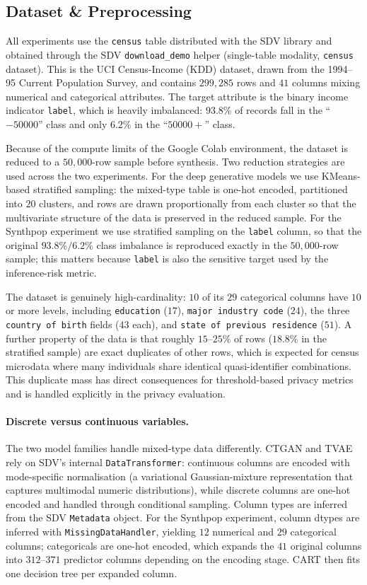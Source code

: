 \documentclass[11pt]{article}
\begin{document}
\subsection{Dataset \& Preprocessing}

All experiments use the \texttt{census} table distributed with the SDV library and obtained through the SDV \texttt{download\_demo} helper (single-table modality, \texttt{census} dataset). This is the UCI Census-Income (KDD) dataset, drawn from the 1994--95 Current Population Survey, and contains $299{,}285$ rows and $41$ columns mixing numerical and categorical attributes. The target attribute is the binary income indicator \texttt{label}, which is heavily imbalanced: $93.8\%$ of records fall in the ``$-50000$'' class and only $6.2\%$ in the ``$50000+$'' class.

Because of the compute limits of the Google Colab environment, the dataset is reduced to a $50{,}000$-row sample before synthesis. Two reduction strategies are used across the two experiments. For the deep generative models we use KMeans-based stratified sampling: the mixed-type table is one-hot encoded, partitioned into $20$ clusters, and rows are drawn proportionally from each cluster so that the multivariate structure of the data is preserved in the reduced sample. For the Synthpop experiment we use stratified sampling on the \texttt{label} column, so that the original $93.8\%/6.2\%$ class imbalance is reproduced exactly in the $50{,}000$-row sample; this matters because \texttt{label} is also the sensitive target used by the inference-risk metric.

The dataset is genuinely high-cardinality: $10$ of its $29$ categorical columns have $10$ or more levels, including \texttt{education} ($17$), \texttt{major industry code} ($24$), the three \texttt{country of birth} fields ($43$ each), and \texttt{state of previous residence} ($51$). A further property of the data is that roughly $15$--$25\%$ of rows ($18.8\%$ in the stratified sample) are exact duplicates of other rows, which is expected for census microdata where many individuals share identical quasi-identifier combinations. This duplicate mass has direct consequences for threshold-based privacy metrics and is handled explicitly in the privacy evaluation.

\paragraph{Discrete versus continuous variables.} The two model families handle mixed-type data differently. CTGAN and TVAE rely on SDV's internal \texttt{DataTransformer}: continuous columns are encoded with mode-specific normalisation (a variational Gaussian-mixture representation that captures multimodal numeric distributions), while discrete columns are one-hot encoded and handled through conditional sampling. Column types are inferred from the SDV \texttt{Metadata} object. For the Synthpop experiment, column dtypes are inferred with \texttt{MissingDataHandler}, yielding $12$ numerical and $29$ categorical columns; categoricals are one-hot encoded, which expands the $41$ original columns into $312$--$371$ predictor columns depending on the encoding stage. CART then fits one decision tree per expanded column.
\end{document}
